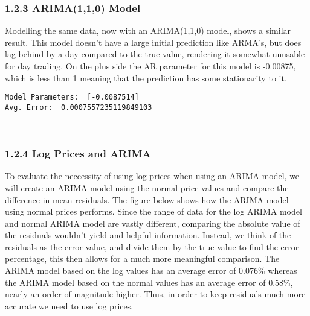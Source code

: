 \documentclass[11pt]{article}
\begin{document}
    \hypertarget{arima110-model}{%
\subsubsection{1.2.3 ARIMA(1,1,0) Model}\label{arima110-model}}

Modelling the same data, now with an ARIMA(1,1,0) model, shows a similar
result. This model doesn't have a large initial prediction like ARMA's,
but does lag behind by a day compared to the true value, rendering it
somewhat unusable for day trading. On the plus side the AR parameter for
this model is -0.00875, which is less than 1 meaning that the prediction
has some stationarity to it.

    \begin{Verbatim}[commandchars=\\\{\}]
Model Parameters:  [-0.0087514]
Avg. Error:  0.0007557235119849103
    \end{Verbatim}

    \begin{center}
    \end{center}
    { \hspace*{\fill} \\}
    
    \hypertarget{log-prices-and-arima}{%
\subsubsection{1.2.4 Log Prices and ARIMA}\label{log-prices-and-arima}}

To evaluate the neccessity of using log prices when using an ARIMA
model, we will create an ARIMA model using the normal price values and
compare the difference in mean residuals. The figure below shows how the
ARIMA model using normal prices performs. Since the range of data for
the log ARIMA model and normal ARIMA model are vastly different,
comparing the absolute value of the residuals wouldn't yield and helpful
information. Instead, we think of the residuals as the error value, and
divide them by the true value to find the error percentage, this then
allows for a much more meaningful comparison. The ARIMA model based on
the log values has an average error of 0.076\% whereas the ARIMA model
based on the normal values has an average error of 0.58\%, nearly an
order of magnitude higher. Thus, in order to keep residuals much more
accurate we need to use log prices.
\end{document}
